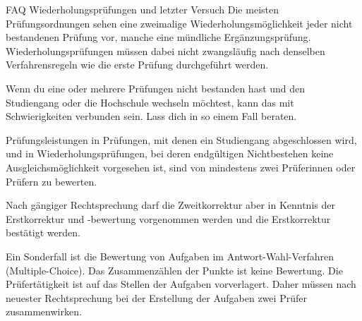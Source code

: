 \begin{artikel}{FAQ Wiederholungsprüfungen und letzter Versuch}
Die meisten Prüfungsordnungen sehen eine zweimalige Wiederholungsmöglichkeit jeder nicht bestandenen Prüfung vor, manche eine mündliche Ergänzungsprüfung. Wiederholungsprüfungen müssen dabei nicht zwangsläufig nach denselben Verfahrensregeln wie die erste Prüfung durchgeführt werden.

Wenn du eine oder mehrere Prüfungen nicht bestanden hast und den Studiengang oder die Hochschule wechseln möchtest, kann das mit Schwierigkeiten verbunden sein. Lass dich in so einem Fall beraten.

Prüfungsleistungen in Prüfungen, mit denen ein Studiengang abgeschlossen wird, und in Wiederholungsprüfungen, bei deren endgültigen Nichtbestehen keine Ausgleichsmöglichkeit vorgesehen ist, sind von mindestens zwei Prüferinnen oder Prüfern zu bewerten.

Nach gängiger Rechtsprechung darf die Zweitkorrektur aber in Kenntnis der Erstkorrektur und -bewertung vorgenommen werden und die Erstkorrektur bestätigt werden.

Ein Sonderfall ist die Bewertung von Aufgaben im Antwort-Wahl-Verfahren (Multiple-Choice). Das Zusammenzählen der Punkte ist keine Bewertung. Die Prüfertätigkeit ist auf das Stellen der Aufgaben vorverlagert. Daher müssen nach neuester Rechtsprechung bei der Erstellung der Aufgaben zwei Prüfer zusammenwirken.
\end{artikel}
